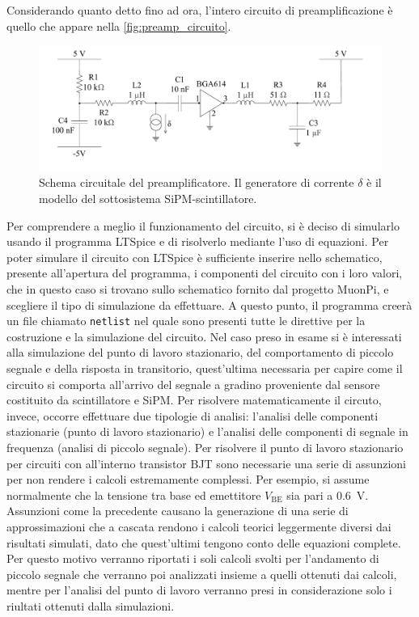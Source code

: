 Considerando quanto detto fino ad ora, l'intero circuito di preamplificazione è quello che appare nella \autoref*{fig:preamp_circuito}.
\begin{figure}[h!]
    \centering
    \includegraphics[width=1\linewidth]{img/preamp_circuito.pdf}
    \caption{Schema circuitale del preamplificatore. Il generatore di corrente $\delta$ è il modello del sottosistema SiPM-scintillatore.}
    \label{fig:preamp_circuito}
\end{figure}
Per comprendere a meglio il funzionamento del circuito, si è deciso di simularlo usando il programma LTSpice e di risolverlo mediante l'uso di 
equazioni. Per poter simulare il circuito con LTSpice è sufficiente inserire nello schematico, presente all'apertura del programma, i componenti del circuito 
con i loro valori, che in questo caso si trovano sullo schematico fornito dal progetto MuonPi, e scegliere il tipo di simulazione da effettuare. 
A questo punto, il programma creerà un file chiamato \texttt{netlist} nel quale sono presenti tutte le direttive per la costruzione e
la simulazione del circuito. Nel caso preso in esame si è interessati alla simulazione del punto di lavoro stazionario, del comportamento di piccolo segnale e della risposta in 
transitorio, quest'ultima necessaria per capire come il circuito si comporta all'arrivo del segnale a gradino proveniente dal sensore costituito da 
scintillatore e SiPM. Per risolvere matematicamente il circuto, invece, occorre effettuare due tipologie di analisi: l'analisi delle componenti 
stazionarie (punto di lavoro stazionario) e l'analisi delle componenti di segnale in frequenza (analisi di piccolo segnale).
Per risolvere il punto di lavoro stazionario per circuiti con all'interno transistor BJT sono necessarie una serie di assunzioni per non 
rendere i calcoli estremamente complessi. Per esempio, si assume normalmente che la tensione tra base ed emettitore $V_{\text{BE}}$ sia pari a 
\SI{0,6}{\volt}. Assunzioni come la precedente causano la generazione di una serie di approssimazioni che a cascata rendono i calcoli teorici 
leggermente diversi dai risultati simulati, dato che quest'ultimi tengono conto delle equazioni complete.
Per questo motivo verranno riportati i soli calcoli svolti per l'andamento di piccolo segnale che verranno poi analizzati insieme a quelli ottenuti  
dai calcoli, mentre per l'analisi del punto di lavoro verranno presi in considerazione solo i riultati ottenuti dalla simulazioni.
